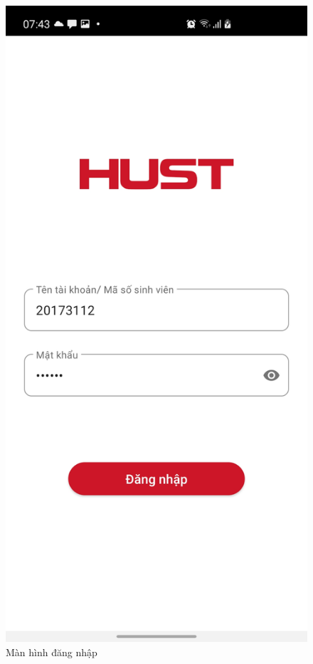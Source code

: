 \documentclass[../Main.tex]{subfiles}
\begin{document}
\begin{figure}[H]
\begin{minipage}{0.5\textwidth}
\includegraphics[width=0.7\linewidth]{Figure/screen/screen_login.jpg}
\caption{Màn hình đăng nhập} \label{fig:screen_login}
\end{minipage}
\hspace{\fill}
\begin{minipage}{0.5\textwidth}

\end{minipage}
\end{figure}
\end{document}
